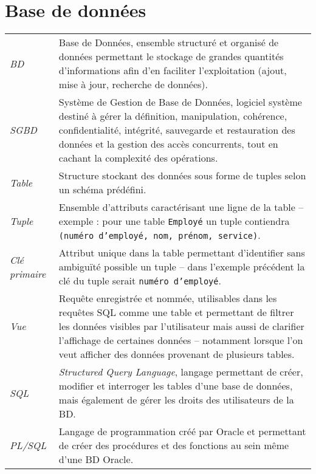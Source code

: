 \section{Base de données}
	\begin{longtable}{>{\itshape}p{}p{}}
		BD		& Base de Données, ensemble structuré et organisé de données permettant le stockage de grandes quantités d’informations afin d’en faciliter l’exploitation (ajout, mise à jour, recherche de données).
		\vspace{2mm}\\
		SGBD	& Système de Gestion de Base de Données, logiciel système destiné à gérer la définition, manipulation, cohérence, confidentialité, intégrité, sauvegarde et restauration des données et la gestion des accès concurrents, tout en cachant la complexité des opérations.
		\vspace{2mm}\\
		Table	& Structure stockant des données sous forme de tuples selon un schéma prédéfini.
		\vspace{2mm}\\
		Tuple	& Ensemble d'attributs caractérisant une ligne de la table -- exemple : pour une table \texttt{Employé} un tuple contiendra \texttt{(numéro d'employé, nom, prénom, service)}.
		\vspace{2mm}\\
		Clé	primaire	& Attribut unique dans la table permettant d'identifier sans ambiguïté possible un tuple -- dans l'exemple précédent la clé du tuple serait \texttt{numéro d'employé}.\vspace{2mm}\\
		Vue	& Requête enregistrée et nommée, utilisables dans les requêtes SQL comme une table et permettant de filtrer les données visibles par l'utilisateur mais aussi de clarifier l'affichage de certaines données -- notamment lorsque l'on veut afficher des données provenant de plusieurs tables.
		\vspace{2mm}\\
		SQL	& \textit{Structured Query Language}, langage permettant de créer, modifier et interroger les tables d’une base de données, mais également de gérer les droits des utilisateurs de la BD.
		\vspace{2mm}\\
		PL/SQL	& Langage de programmation créé par Oracle et permettant de créer des procédures et des fonctions au sein même d'une BD Oracle.
		\vspace{2mm}\\

\end{longtable}
